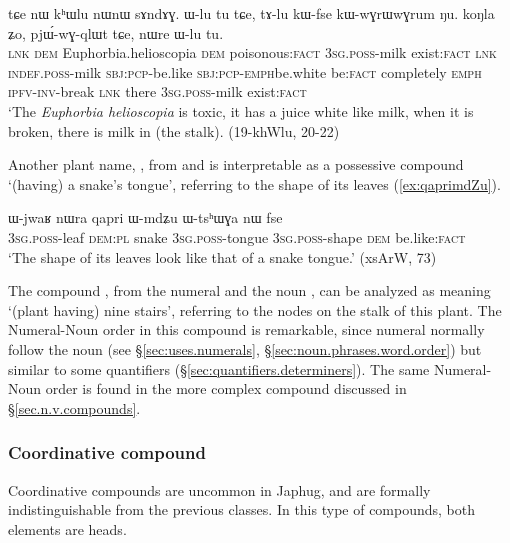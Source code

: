\begin{exe}
\ex \label{ex:khWlu}  
\gll tɕe nɯ kʰɯlu nɯnɯ sɤndɤɣ. ɯ-lu tu tɕe, tɤ-lu kɯ-fse kɯ-wɣrɯ\redp{}wɣrum ŋu. koŋla ʑo, pjɯ́-wɣ-qlɯt tɕe, nɯre ɯ-lu tu.\\
\textsc{lnk} \textsc{dem} Euphorbia.helioscopia \textsc{dem} poisonous:\textsc{fact} \textsc{3sg}.\textsc{poss}-milk exist:\textsc{fact} \textsc{lnk}  \textsc{indef}.\textsc{poss}-milk \textsc{sbj}:\textsc{pcp}-be.like \textsc{sbj}:\textsc{pcp}-\textsc{emph}\redp{}be.white be:\textsc{fact} completely \textsc{emph} \textsc{ipfv}-\textsc{inv}-break \textsc{lnk} there \textsc{3sg}.\textsc{poss}-milk exist:\textsc{fact}\\
\glt `The \textit{Euphorbia helioscopia} is toxic, it has a juice white like milk, when it is broken, there is milk in (the stalk). (19-khWlu, 20-22)
\end{exe}

Another plant name, \textit{}, from  and  is interpretable as a possessive compound `(having) a snake's tongue', referring to the shape of its leaves (\ref{ex:qaprimdZu}).

\begin{exe}
	\ex \label{ex:qaprimdZu}  
	\gll ɯ-jwaʁ nɯra qapri ɯ-mdʑu ɯ-tsʰɯɣa nɯ fse \\
	\textsc{3sg}.\textsc{poss}-leaf \textsc{dem}:\textsc{pl} snake \textsc{3sg}.\textsc{poss}-tongue \textsc{3sg}.\textsc{poss}-shape \textsc{dem} be.like:\textsc{fact} \\
	\glt `The shape of its leaves look like that of a snake tongue.' (xsArW, 73)
\end{exe}



The compound \textit{}, from the numeral  and the noun , can be analyzed as meaning `(plant having) nine stairs', referring to the nodes on the stalk of this plant. The Numeral-Noun order in this compound is remarkable, since numeral normally follow the noun (see §\ref{sec:uses.numerals}, §\ref{sec:noun.phrases.word.order}) but similar to some quantifiers (§\ref{sec:quantifiers.determiners}). The same Numeral-Noun order is found in the more complex compound \textit{} discussed in §\ref{sec.n.v.compounds}.


\subsubsection{Coordinative compound} \label{sec:coordinative.n.n}
Coordinative compounds are uncommon in Japhug, and are formally indistinguishable from the previous classes. In this type of compounds, both elements are heads.

